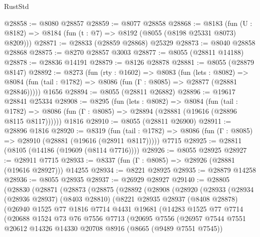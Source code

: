 \begin{lexlean}{RustStd}
\begin{coremodule}
@28858 := @8080 @28857
@28859 := @8077 @28858
@28868 := @8183
    (fun (U : @8182) => @8184 (fun (t : @7) => @8192 (@8055 (@8198 @25331 @8073) @8209)))
@28871 := @28833 (@28859 @28868) @25329
@28873 := @8040 @28858 @28868
@28875 := @8270 @28857 @3003
@28877 := @8055 (@28811 @14188)
@28878 := @28836 @14191
@28879 := @8126 @28878
@28881 := @8055 (@28879 @8147)
@28892 := @8273
    (fun (rty : @1602) =>
    @8083
      (fun (lets : @8082) =>
      @8084 (fun (tail : @1782) => @8086 (fun (Γ : @8085) => @28877 (@28881 @28846)))))
    @1656
@28894 := @8055 (@28811 @26882)
@28896 := @19617 @28841 @25334
@28908 := @8295
    (fun (lets : @8082) =>
    @8084
      (fun (tail : @1782) =>
      @8086 (fun (Γ : @8085) => @28894 (@28881 (@19616 (@28896 @8115 @8117))))))
    @1816
@28910 := @8055 (@28811 @26900)
@28911 := @28896 @1816
@28920 := @8319
    (fun (tail : @1782) => @8086 (fun (Γ : @8085) => @28910 (@28881 (@19616 (@28911 @8117)))))
    @7715
@28925 := @28811 (@8105 (@14186 (@19609 (@8114 @7716))))
@28926 := @8055 @28925
@28927 := @28911 @7715
@28933 := @8337 (fun (Γ : @8085) => @28926 (@28881 (@19616 @28927))) @14255
@28934 := @8221 @28925
@28935 := @28879 @14258
@28936 := @8055 @28935
@28937 := @26929 @28927
@29140 := @28805
    (@28830
      (@28871
        (@28873
          (@28875
            (@28892
              (@28908
                (@28920
                  (@28933
                    (@28934
                      (@28936 @28937)
                      (@8403 @28810)
                      (@8221
                        @28935
                        @28937
                        (@8408 @28878)
                        (@26940
                          @1525
                          @77
                          @1816
                          @7714
                          @4431
                          @19681
                          (@14283
                            @1525
                            @77
                            @7714
                            (@20688
                              @1524
                              @73
                              @76
                              @7556
                              @7713
                              (@20695
                                @7556
                                (@26957
                                  @7544
                                  @7551
                                  @20612
                                  @14326
                                  @14330
                                  @20708
                                  @8916
                                  (@8665 (@9489 @7551 @7545))

\end{coremodule}
\end{lexlean}
